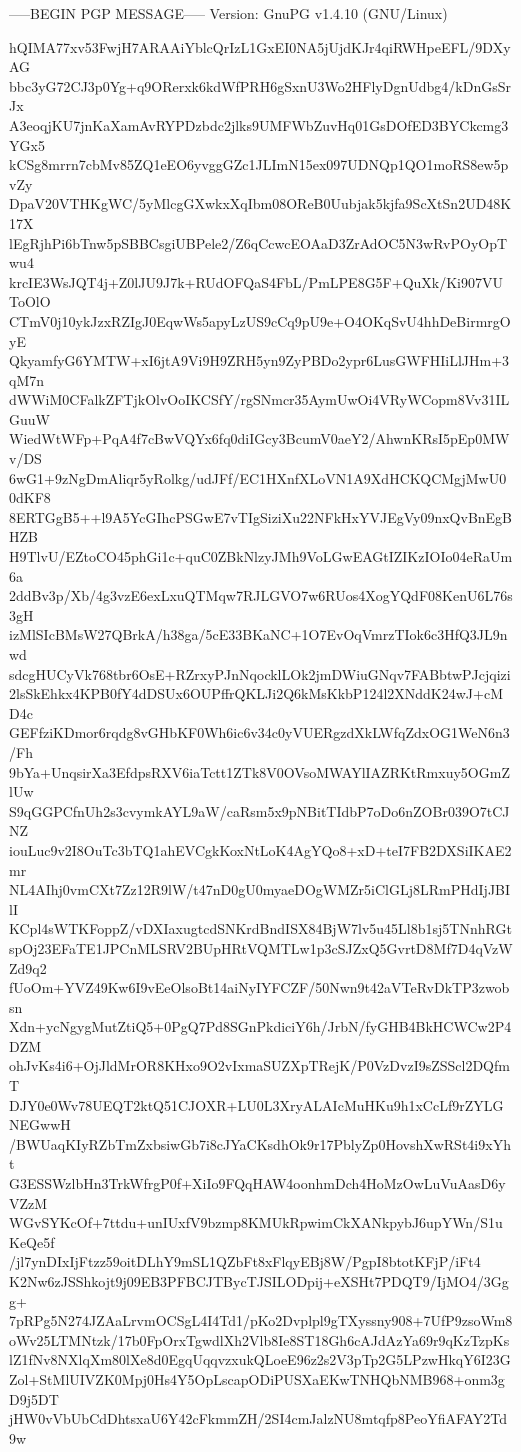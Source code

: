 -----BEGIN PGP MESSAGE-----
Version: GnuPG v1.4.10 (GNU/Linux)

hQIMA77xv53FwjH7ARAAiYblcQrIzL1GxEI0NA5jUjdKJr4qiRWHpeEFL/9DXyAG
bbc3yG72CJ3p0Yg+q9ORerxk6kdWfPRH6gSxnU3Wo2HFlyDgnUdbg4/kDnGsSrJx
A3eoqjKU7jnKaXamAvRYPDzbdc2jlks9UMFWbZuvHq01GsDOfED3BYCkcmg3YGx5
kCSg8mrrn7cbMv85ZQ1eEO6yvggGZc1JLImN15ex097UDNQp1QO1moRS8ew5pvZy
DpaV20VTHKgWC/5yMlcgGXwkxXqIbm08OReB0Uubjak5kjfa9ScXtSn2UD48K17X
lEgRjhPi6bTnw5pSBBCsgiUBPele2/Z6qCcwcEOAaD3ZrAdOC5N3wRvPOyOpTwu4
krcIE3WsJQT4j+Z0lJU9J7k+RUdOFQaS4FbL/PmLPE8G5F+QuXk/Ki907VUToOlO
CTmV0j10ykJzxRZIgJ0EqwWs5apyLzUS9cCq9pU9e+O4OKqSvU4hhDeBirmrgOyE
QkyamfyG6YMTW+xI6jtA9Vi9H9ZRH5yn9ZyPBDo2ypr6LusGWFHIiLlJHm+3qM7n
dWWiM0CFalkZFTjkOlvOoIKCSfY/rgSNmcr35AymUwOi4VRyWCopm8Vv31ILGuuW
WiedWtWFp+PqA4f7cBwVQYx6fq0diIGcy3BcumV0aeY2/AhwnKRsI5pEp0MWv/DS
6wG1+9zNgDmAliqr5yRolkg/udJFf/EC1HXnfXLoVN1A9XdHCKQCMgjMwU00dKF8
8ERTGgB5++l9A5YcGIhcPSGwE7vTIgSiziXu22NFkHxYVJEgVy09nxQvBnEgBHZB
H9TlvU/EZtoCO45phGi1c+quC0ZBkNlzyJMh9VoLGwEAGtIZIKzIOIo04eRaUm6a
2ddBv3p/Xb/4g3vzE6exLxuQTMqw7RJLGVO7w6RUos4XogYQdF08KenU6L76s3gH
izMlSIcBMsW27QBrkA/h38ga/5cE33BKaNC+1O7EvOqVmrzTIok6c3HfQ3JL9nwd
sdcgHUCyVk768tbr6OsE+RZrxyPJnNqocklLOk2jmDWiuGNqv7FABbtwPJcjqizi
2lsSkEhkx4KPB0fY4dDSUx6OUPffrQKLJi2Q6kMsKkbP124l2XNddK24wJ+cMD4c
GEFfziKDmor6rqdg8vGHbKF0Wh6ic6v34c0yVUERgzdXkLWfqZdxOG1WeN6n3/Fh
9bYa+UnqsirXa3EfdpsRXV6iaTctt1ZTk8V0OVsoMWAYlIAZRKtRmxuy5OGmZlUw
S9qGGPCfnUh2s3cvymkAYL9aW/caRsm5x9pNBitTIdbP7oDo6nZOBr039O7tCJNZ
iouLuc9v2I8OuTc3bTQ1ahEVCgkKoxNtLoK4AgYQo8+xD+teI7FB2DXSiIKAE2mr
NL4AIhj0vmCXt7Zz12R9lW/t47nD0gU0myaeDOgWMZr5iClGLj8LRmPHdIjJBIlI
KCpl4sWTKFoppZ/vDXIaxugtcdSNKrdBndISX84BjW7lv5u45Ll8b1sj5TNnhRGt
spOj23EFaTE1JPCnMLSRV2BUpHRtVQMTLw1p3cSJZxQ5GvrtD8Mf7D4qVzWZd9q2
fUoOm+YVZ49Kw6I9vEeOlsoBt14aiNyIYFCZF/50Nwn9t42aVTeRvDkTP3zwobsn
Xdn+ycNgygMutZtiQ5+0PgQ7Pd8SGnPkdiciY6h/JrbN/fyGHB4BkHCWCw2P4DZM
ohJvKs4i6+OjJldMrOR8KHxo9O2vIxmaSUZXpTRejK/P0VzDvzI9sZSScl2DQfmT
DJY0e0Wv78UEQT2ktQ51CJOXR+LU0L3XryALAIcMuHKu9h1xCcLf9rZYLGNEGwwH
/BWUaqKIyRZbTmZxbsiwGb7i8cJYaCKsdhOk9r17PblyZp0HovshXwRSt4i9xYht
G3ESSWzlbHn3TrkWfrgP0f+XiIo9FQqHAW4oonhmDch4HoMzOwLuVuAasD6yVZzM
WGvSYKcOf+7ttdu+unIUxfV9bzmp8KMUkRpwimCkXANkpybJ6upYWn/S1uKeQe5f
/jl7ynDIxIjFtzz59oitDLhY9mSL1QZbFt8xFlqyEBj8W/PgpI8btotKFjP/iFt4
K2Nw6zJSShkojt9j09EB3PFBCJTBycTJSILODpij+eXSHt7PDQT9/IjMO4/3Ggg+
7pRPg5N274JZAaLrvmOCSgL4I4Td1/pKo2Dvplpl9gTXyssny908+7UfP9zsoWm8
oWv25LTMNtzk/17b0FpOrxTgwdlXh2Vlb8Ie8ST18Gh6cAJdAzYa69r9qKzTzpKs
lZ1fNv8NXlqXm80lXe8d0EgqUqqvzxukQLoeE96z2s2V3pTp2G5LPzwHkqY6I23G
Zol+StMlUIVZK0Mpj0Hs4Y5OpLscapODiPUSXaEKwTNHQbNMB968+onm3gD9j5DT
jHW0vVbUbCdDhtsxaU6Y42cFkmmZH/2SI4cmJalzNU8mtqfp8PeoYfiAFAY2Td9w
